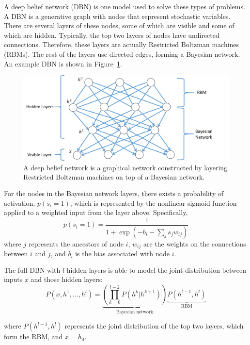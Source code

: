 \documentclass[12pt]{report}
\begin{document}
A deep belief network (DBN) is one model used to solve these types of problems. 
A DBN is a generative graph with nodes that represent stochastic variables.
There are several layers of these nodes, some of which are visible and some of which are hidden.
Typically, the top two layers of nodes have undirected connections.
Therefore, these layers are actually Restricted Boltzman machines (RBMs).
The rest of the layers use directed edges, forming a Bayesian network.
An example DBN is shown in Figure~\ref{fig:DBN}.

\begin{figure}[t]
    \centering
        \includegraphics[width=.7\columnwidth,trim={0mm 0mm 0mm 0mm},clip]{dbn}
        \vspace{-7pt}
        \caption[Deep Belief Network]{A deep belief network is a graphical network constructed by layering Restricted Boltzman machines on top of a Bayesian network. \cite{hinton_fast_2006}}
        \label{fig:DBN}
\end{figure}

For the nodes in the Bayesian network layers, there exists a probability of activation, $p(s_i=1)$, which is represented by the nonlinear sigmoid function applied to a weighted input from the layer above.
Specifically,
\begin{equation}
p(s_i=1) = \frac{1}{1+\exp \left(-b_i-\sum_j s_j w_{ij}\right)}
\end{equation}
where $j$ represents the ancestors of node $i$, $w_{ij}$ are the weights on the connections between $i$ and $j$, and $b_i$ is the bias associated with node $i$.

The full DBN with $l$ hidden layers is able to model the joint distribution between inputs $x$ and those hidden layers:
\begin{equation}
P(x, h^1, ..., h^l) = \underbrace{\left(\prod_{k=0}^{l-2}P(h^k|h^{k+1}) \right)}_{\text{Bayesian network}} \underbrace{P(h^{l-1},h^l)}_{\text{RBM}}
\end{equation}

where $P(h^{l-1},h^l)$ represents the joint distribution of the top two layers, which form the RBM, and $x = h_0$.
\end{document}
